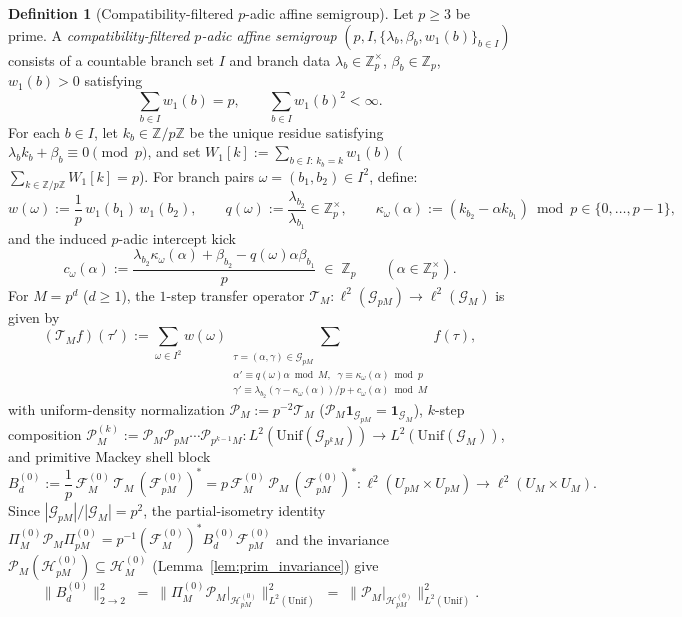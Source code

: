\documentclass[11pt,a4paper]{article}
\numberwithin{equation}{section}
\theoremstyle{definition}
\newtheorem{definition}[theorem]{Definition}
\theoremstyle{remark}
\newcommand{\Z}{\mathbb{Z}}
\newcommand{\cG}{\mathcal{G}}
\newcommand{\cF}{\mathcal{F}}
\newcommand{\cH}{\mathcal{H}}
\newcommand{\cT}{\mathcal{T}}
\newcommand{\cP}{\mathcal{P}}
\newcommand{\Unif}{\mathrm{Unif}}
\begin{document}
\begin{definition}[Compatibility-filtered $p$-adic affine semigroup]\label{def:padic_semigroup}
Let $p \ge 3$ be prime. A \emph{compatibility-filtered $p$-adic affine semigroup} $(p, I, \{\lambda_b, \beta_b, w_1(b)\}_{b \in I})$ consists of a countable branch set $I$ and branch data $\lambda_b \in \Z_p^\times$, $\beta_b \in \Z_p$, $w_1(b) > 0$ satisfying
\[
\sum_{b \in I} w_1(b) = p, \qquad \sum_{b \in I} w_1(b)^2 < \infty.
\]
For each $b \in I$, let $k_b \in \Z/p\Z$ be the unique residue satisfying $\lambda_b k_b + \beta_b \equiv 0 \pmod p$, and set $W_1[k] := \sum_{b \in I:\, k_b = k} w_1(b)$ ($\sum_{k \in \Z/p\Z} W_1[k] = p$). For branch pairs $\omega = (b_1, b_2) \in I^2$, define:
\[
w(\omega) := \frac{1}{p}\,w_1(b_1)\,w_1(b_2), \qquad q(\omega) := \frac{\lambda_{b_2}}{\lambda_{b_1}} \in \Z_p^\times, \qquad \kappa_\omega(\alpha) := (k_{b_2} - \alpha k_{b_1}) \bmod p \in \{0, \dots, p-1\},
\]
and the induced $p$-adic intercept kick
\[
c_\omega(\alpha) := \frac{\lambda_{b_2}\kappa_\omega(\alpha) + \beta_{b_2} - q(\omega)\alpha \beta_{b_1}}{p} \;\in\; \Z_p \qquad (\alpha \in \Z_p^\times).
\]
For $M = p^d$ ($d \ge 1$), the $1$-step transfer operator $\cT_M : \ell^2(\cG_{pM}) \to \ell^2(\cG_M)$ is given by
\[
(\cT_M f)(\tau') := \sum_{\omega \in I^2} w(\omega)\sum_{\substack{\tau = (\alpha, \gamma) \in \cG_{pM} \\ \alpha' \equiv q(\omega)\alpha \bmod M,\;\; \gamma \equiv \kappa_\omega(\alpha) \bmod p \\ \gamma' \equiv \lambda_{b_2}(\gamma - \kappa_\omega(\alpha))/p + c_\omega(\alpha) \bmod M}} f(\tau),
\]
with uniform-density normalization $\cP_M := p^{-2}\cT_M$ ($\cP_M\mathbf{1}_{\cG_{pM}} = \mathbf{1}_{\cG_M}$), $k$-step composition $\cP_M^{(k)} := \cP_M\cP_{pM}\cdots\cP_{p^{k-1}M} : L^2(\Unif(\cG_{p^k M})) \to L^2(\Unif(\cG_M))$, and primitive Mackey shell block
\[
B_d^{(0)} := \frac{1}{p}\,\cF_M^{(0)}\,\cT_M\,(\cF_{pM}^{(0)})^* = p\,\cF_M^{(0)}\,\cP_M\,(\cF_{pM}^{(0)})^* : \ell^2(U_{pM}\times U_{pM}) \longrightarrow \ell^2(U_M\times U_M).
\]
Since $|\cG_{pM}|/|\cG_M| = p^2$, the partial-isometry identity $\Pi_M^{(0)}\cP_M\Pi_{pM}^{(0)} = p^{-1}(\cF_M^{(0)})^* B_d^{(0)}\cF_{pM}^{(0)}$ and the invariance $\cP_M(\cH_{pM}^{(0)}) \subseteq \cH_M^{(0)}$ (Lemma~\ref{lem:prim_invariance}) give
\[
\|B_d^{(0)}\|_{2\to 2}^2 \;=\; \bigl\|\Pi_M^{(0)}\cP_M\big|_{\cH_{pM}^{(0)}}\bigr\|_{L^2(\Unif)}^2 \;=\; \bigl\|\cP_M\big|_{\cH_{pM}^{(0)}}\bigr\|_{L^2(\Unif)}^2.
\]
\end{definition}
\end{document}

